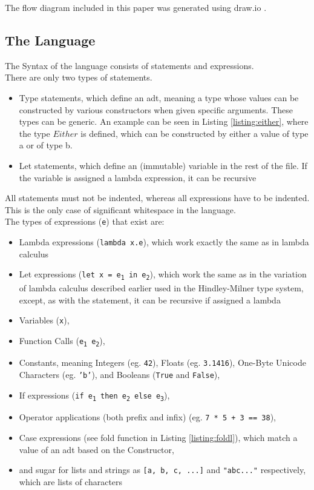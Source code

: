 \documentclass[12pt]{article}
\newcommand{\importListing}[1]{
    \begin{minipage}{\textwidth}
    
    \end{minipage}
}
\begin{document}
The flow diagram included in this paper was generated using draw.io \autocite{drawioltdDrawio}.

\subsection{The Language}
\importListing{code/either.tex}
The Syntax of the language consists of statements and expressions.
\\
There are only two types of statements.
\begin{itemize}
	\item Type statements, which define an \Gls{adt},
	      meaning a type whose values can be constructed by various
	      constructors when given specific arguments.
	      These types can be generic.
	      An example can be seen in Listing \ref{listing:either}, where the type $Either$ is defined,
	      which can be constructed by either a value of type a or of type b.
	\item Let statements, which define an (immutable) variable
	      in the rest of the file. If the variable is assigned a
	      lambda expression, it can be recursive
\end{itemize}
All statements must not be indented,
whereas all expressions have to be indented.
This is the only case of significant whitespace in the language.
\\
The types of expressions (\texttt{e}) that exist are:
\begin{itemize}
	\item Lambda expressions (\texttt{lambda x.e}), which work exactly
	      the same as in lambda calculus
	\item Let expressions (\texttt{let x = e\textsubscript{1} in e\textsubscript{2}}),
	      which work the same as in the variation of lambda calculus
	      described earlier used in the Hindley-Milner type system,
	      except, as with the statement,
	      it can be recursive if assigned a lambda
	\item Variables (\texttt{x}),
	\item Function Calls (\texttt{e\textsubscript{1} e\textsubscript{2}}),
	\item Constants, meaning Integers (eg. \texttt{42}), Floats (eg. \texttt{3.1416}),
	      One-Byte Unicode Characters (eg. \texttt{'b'}), and Booleans (\texttt{True} and \texttt{False}),
	\item If expressions (\texttt{if e\textsubscript{1} then e\textsubscript{2} else e\textsubscript{3}}),
	\item Operator applications (both prefix and infix) (eg. \texttt{7 * 5 + 3 == 38}),
	\item Case expressions (see fold function in Listing \ref{listing:foldl}), which match a value of an \Gls{adt}
	      based on the Constructor,
	\item and \gls{sugar} for lists and strings as \texttt{[a, b, c, ...]} and \texttt{"abc..."} respectively,
	      which are lists of characters
\end{itemize}
\end{document}
